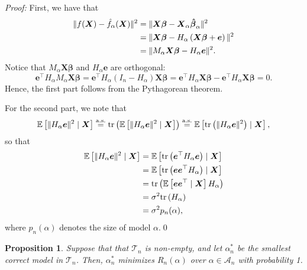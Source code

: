 \documentclass[11pt, letter paper]{article}
\newcommand{\1}{\mathmybb{1}}
\newtheorem{proposition}{Proposition}[section]
\newcommand{\0}{\emptyset}
\newcommand{\Ep}[1]{\mathbb{E}\left[ #1 \right]}
\newcommand{\paren}[1]{\left(#1 \right)}
\newcommand{\norm}[1]{|\hspace{-1pt}|#1 |\hspace{-1pt}|}
\newcommand{\normsq}[1]{\norm{#1}^{2}}
\newcommand{\Acal}{\mathcal{A}_{n}}
\newcommand{\Tcal}{\mathcal{T}_{n}}
\newcommand{\aseq}{\stackrel{\mathrm{a.s.}}{=}}
\newcommand{\X}{\boldsymbol{X}}
\newcommand{\e}{\boldsymbol{e}}
\newcommand{\bbeta}{\boldsymbol{\beta}}
\newcommand{\bbetahat}{\boldsymbol{\hat{\beta}}}
\newcommand{\tr}[1]{\mathrm{tr}\paren{#1}}
\begin{document}
\begin{myproofbox}
    \textit{Proof: }
    First, we have that
    \begin{align*}
        \normsq{f(\X) - \hat{f}_{\alpha}(\X)} &= \normsq{\X\bbeta - \X_{\alpha}\bbetahat_{\alpha}}\\
        &= \normsq{\X\bbeta - H_{\alpha}\paren{\X\bbeta + \e}}\\
        &= \normsq{M_{\alpha}\X\bbeta - H_{\alpha}\e}.
    \end{align*}
    Notice that \(M_{\alpha}\X\bbeta\) and \(H_{\alpha}\e\) are orthogonal:
    \[\e^{\top}H_{\alpha}M_{\alpha}\X\bbeta  = \e^{\top}H_{\alpha}\paren{I_{n} - H_{\alpha}}\X\bbeta = \e^{\top}H_{\alpha}\X\bbeta - \e^{\top}H_{\alpha}\X\bbeta = 0.\]
    Hence, the first part follows from the Pythagorean theorem.

    For the second part, we note that \[\Ep{\normsq{H_{\alpha}\e}\mid\X} \aseq \tr{\Ep{\normsq{H_{\alpha}\e}\mid\X}} \aseq \Ep{\tr{\normsq{H_{\alpha}\e}}\mid\X},\]
    so that
    \begin{align*}
        \Ep{\normsq{H_{\alpha}\e}\mid\X} &= \Ep{\tr{\e^{\top}H_{\alpha}\e}\mid\X}\\
        &= \Ep{\tr{\e\e^{\top}H_{\alpha}}\mid\X}\\
        &= \tr{\Ep{\e\e^{\top}\mid\X}H_{\alpha}}\\
        &= \sigma^2\tr{H_{\alpha}}\\
        &= \sigma^{2}p_{n}(\alpha),
    \end{align*}
    where \(p_{n}(\alpha)\) denotes the size of model \(\alpha\).\qed{}
\end{myproofbox}

\begin{proposition}\label{prop:Ropt}
    Suppose that that \(\Tcal\) is non-empty, and let \(\alpha^{*}_{n}\) be the smallest correct model in \(\Tcal\). Then, \(\alpha^{*}_{n}\) minimizes \(R_{n}(\alpha)\) over \(\alpha\in\Acal\) with probability 1.
\end{proposition}
\end{document}
